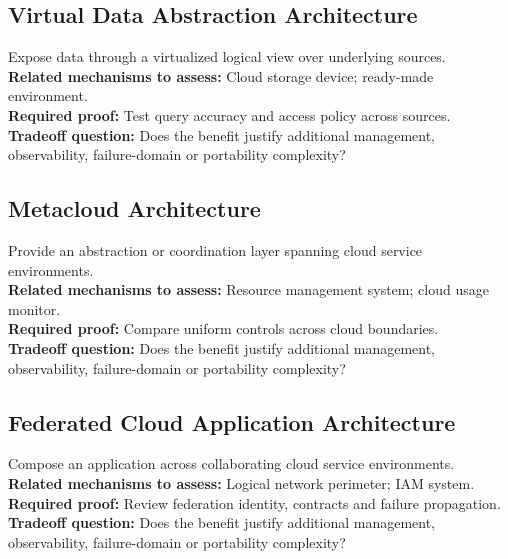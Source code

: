 \documentclass[10pt,letterpaper]{article}
\begin{document}
\subsection{Virtual Data Abstraction Architecture}
Expose data through a virtualized logical view over underlying sources.\\[3pt]
\textbf{Related mechanisms to assess:} Cloud storage device; ready-made environment.\\[3pt]
\textbf{Required proof:} Test query accuracy and access policy across sources.\\[3pt]
\textbf{Tradeoff question:} Does the benefit justify additional management, observability, failure-domain or portability complexity?\\[3pt]
\subsection{Metacloud Architecture}
Provide an abstraction or coordination layer spanning cloud service environments.\\[3pt]
\textbf{Related mechanisms to assess:} Resource management system; cloud usage monitor.\\[3pt]
\textbf{Required proof:} Compare uniform controls across cloud boundaries.\\[3pt]
\textbf{Tradeoff question:} Does the benefit justify additional management, observability, failure-domain or portability complexity?\\[3pt]
\subsection{Federated Cloud Application Architecture}
Compose an application across collaborating cloud service environments.\\[3pt]
\textbf{Related mechanisms to assess:} Logical network perimeter; IAM system.\\[3pt]
\textbf{Required proof:} Review federation identity, contracts and failure propagation.\\[3pt]
\textbf{Tradeoff question:} Does the benefit justify additional management, observability, failure-domain or portability complexity?\\[3pt]
\end{document}
